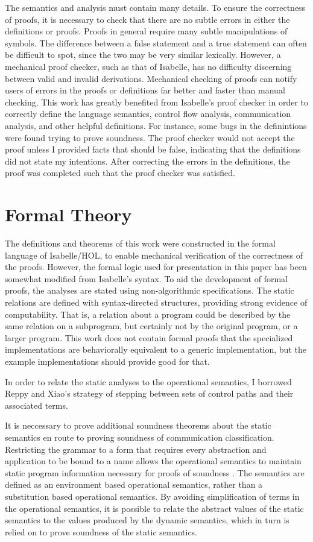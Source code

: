 \documentclass{article}
\begin{document}
The semantics and analysis must contain many details. To ensure the
correctness of proofs, it is necessary to check that there are no subtle errors in either the 
definitions or proofs. Proofs in general require many subtle manipulations of symbols. The
difference between a false statement and a true statement can often be difficult to spot, since
the two may be very similar lexically. However, a mechanical proof checker, such as that of 
Isabelle, has no difficulty discerning between valid and invalid derivations.
Mechanical checking of proofs can notify users of errors in the proofs or definitions far better
and faster than manual checking. This work has greatly benefited from Isabelle's proof checker in
order to correctly define the language semantics, control flow analysis, communication analysis,
and other helpful definitions. For instance, some bugs in the definintions were found trying to prove
soundness. The proof checker would not accept the proof unless I provided facts that
should be false, indicating that the definitions did not state my intentions.
After correcting the errors in the definitions, the proof was completed such that the proof
checker was satisfied.

\section{Formal Theory}

The definitions and theorems of this work were constructed in the formal language of Isabelle/HOL,
to enable mechanical verification of the correctness of the proofs. However, the formal logic used
for presentation in this paper has been somewhat modified from Isabelle's syntax. 
To aid the development of formal proofs, the analyses are stated using non-algorithmic specifications.
The static relations are defined
with syntax-directed structures, providing strong evidence of computability.
That is, a relation about a program could be described by the same relation on a subprogram,
but certainly not by the original program, or a larger program.
This work does not contain formal proofs that  the specialized implementations are
behaviorally equivalent to a generic implementation, but the example implementations
should provide good for that.

In order to relate the static analyses to the operational semantics, I
borrowed Reppy and Xiao's strategy of stepping between sets of control paths and
their associated terms.

It is neccessary to prove additional soundness theorems about the static semantics en route to
proving soundness of communication classification. Restricting the grammar to a form that requires
every abstraction and application to be bound to a name allows the operational
semantics to maintain static program information necessary for proofs of soundness \cite{}.
The semantics are defined as an environment based operational semantics, rather than a
substitution based operational semantics. By avoiding simplification of terms in the
operational semantics, it is possible to relate the abstract values of the static semantics to the
values produced by the dynamic semantics, which in turn is relied on to prove 
soundness of the static semantics.
\end{document}
